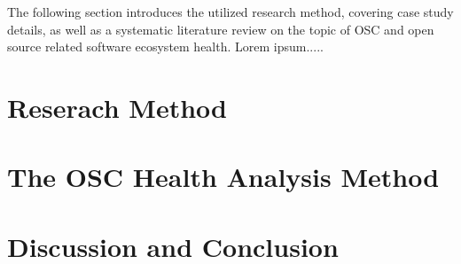 \documentclass[final,5p,times,twocolumn]{elsarticle}
\begin{document}
The following section introduces the utilized research method, covering case study details, as well as a systematic literature review on the topic of OSC and open source related software ecosystem health. Lorem ipsum.....
\section{Reserach Method}
\label{reserach_method_section}

\section{The OSC Health Analysis Method}
\label{OSC_method_section}

\section{Discussion and Conclusion}
\label{discussion_conclusion_section}







\end{document}
